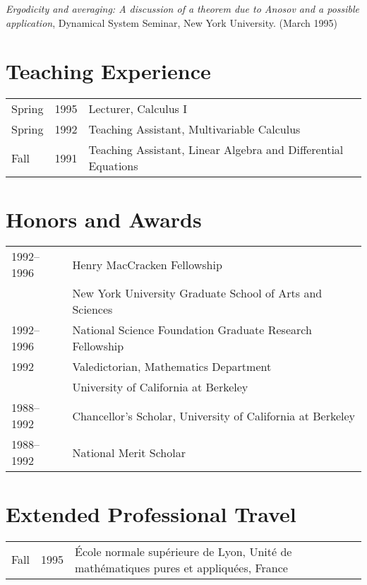 \documentclass[margin,line,pifont,palatino,courier]{res}
\begin{document}
\begin{resume}
\emph{Ergodicity and averaging: A discussion of a theorem due to
Anosov and a possible application}, Dynamical System Seminar, New
York University. (March 1995)



\newpage


\section{\sc Teaching Experience}

\begin{tabular}{@{}p{0.4in}p{0.3in}p{4in}}
Spring & 1995 & Lecturer, Calculus I\\
Spring & 1992 & Teaching Assistant, Multivariable Calculus\\
Fall & 1991 & Teaching Assistant, Linear Algebra and Differential Equations\\
\end{tabular}



\section{\sc Honors and Awards}

\begin{tabular}{@{}p{0.8in}p{4in}}
1992--1996 & Henry MacCracken Fellowship\\
           & New York University Graduate School of Arts and Sciences  \\
1992--1996 & National Science Foundation Graduate Research Fellowship  \\
1992    & Valedictorian, Mathematics Department  \\
           & University of California at Berkeley\\
1988--1992 & Chancellor's Scholar, University of California at Berkeley \\
1988--1992 & National Merit Scholar\\
\end{tabular}



\section{\sc Extended Professional Travel}

\begin{tabular}{@{}p{0.4in}p{0.3in}p{4in}}
Fall & 1995 & École normale supérieure de Lyon, Unité de
mathématiques pures et appliquées, France\\



\end{tabular}
\end{resume}
\end{document}
